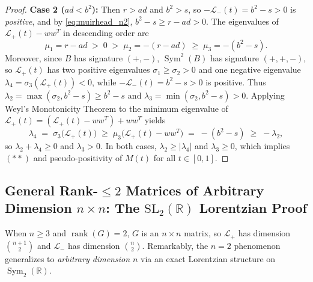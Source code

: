 \documentclass[11pt,a4paper]{article}
\theoremstyle{plain}
\theoremstyle{definition}
\theoremstyle{remark}
\DeclareMathOperator{\Sym}{Sym}
\DeclareMathOperator{\rank}{rank}
\begin{document}
\begin{proof}
\textbf{Case 2 ($ad < b^2$):} Then $r > ad$ and $b^2 > s$, so $-\mathcal{L}_-(t) = b^2 - s > 0$ is \emph{positive}, and by \eqref{eq:muirhead_n2}, $b^2 - s \ge r - ad > 0$. The eigenvalues of $\mathcal{L}_+(t) - w w^T$ in descending order are
\[
  \mu_1 = r - ad \;>\; 0 \;>\; \mu_2 = -(r - ad) \;\ge\; \mu_3 = -(b^2 - s).
\]
Moreover, since $B$ has signature $(+,-)$, $\Sym^2(B)$ has signature $(+,+,-)$, so $\mathcal{L}_+(t)$ has two positive eigenvalues $\sigma_1 \ge \sigma_2 > 0$ and one negative eigenvalue $\lambda_4 = \sigma_3(\mathcal{L}_+(t)) < 0$, while $-\mathcal{L}_-(t) = b^2 - s > 0$ is positive. Thus $\lambda_2 = \max(\sigma_2, b^2 - s) \ge b^2 - s$ and $\lambda_3 = \min(\sigma_2, b^2 - s) > 0$. Applying Weyl's Monotonicity Theorem to the minimum eigenvalue of $\mathcal{L}_+(t) = (\mathcal{L}_+(t) - w w^T) + w w^T$ yields
\[
  \lambda_4 \;=\; \sigma_3\big(\mathcal{L}_+(t)\big) \;\ge\; \mu_3\big(\mathcal{L}_+(t) - w w^T\big) \;=\; -(b^2 - s) \;\ge\; -\lambda_2,
\]
so $\lambda_2 + \lambda_4 \ge 0$ and $\lambda_3 > 0$. In both cases, $\lambda_2 \ge |\lambda_4|$ and $\lambda_3 \ge 0$, which implies $(**)$ and pseudo-positivity of $M(t)$ for all $t \in [0,1]$.
\end{proof}

\subsection{General Rank-\texorpdfstring{$\le 2$}{<= 2} Matrices of Arbitrary Dimension \texorpdfstring{$n \times n$}{n x n}: The \texorpdfstring{$\mathrm{SL}_2(\mathbb{R})$}{SL2(R)} Lorentzian Proof}

When $n \ge 3$ and $\rank(G) = 2$, $G$ is an $n \times n$ matrix, so $\mathcal{L}_+$ has dimension $\binom{n+1}{2}$ and $\mathcal{L}_-$ has dimension $\binom{n}{2}$. Remarkably, the $n = 2$ phenomenon generalizes to \emph{arbitrary dimension $n$} via an exact Lorentzian structure on $\Sym_2(\mathbb{R})$.
\end{document}
